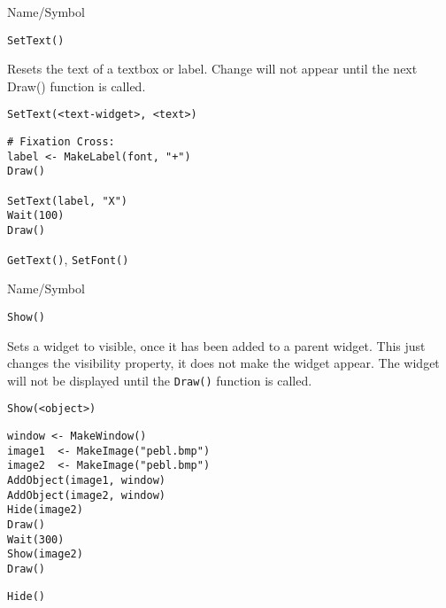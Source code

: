 \rl


\begin{desc}{Name/Symbol}

\item[Name/Symbol] 	\verb+SetText()+

\item[Description] 	Resets the text of a textbox or label.  Change will not
		appear until the next Draw() function is called.

\item[Usage]
\begin{verbatim}
SetText(<text-widget>, <text>)
\end{verbatim}

\item[Example]
\begin{verbatim}
# Fixation Cross:
label <- MakeLabel(font, "+")
Draw()

SetText(label, "X")
Wait(100)
Draw()
\end{verbatim}

\item[See Also]    	\verb+GetText()+, \verb+SetFont()+
\end{desc}

\rl


\begin{desc}{Name/Symbol}
\item[Name/Symbol]  	\verb+Show()+

\item[Description] Sets a widget to visible, once it has been added to
  a parent widget.  This just changes the visibility property, it does
  not make the widget appear.  The widget will not be displayed until
  the \verb+Draw()+ function is called.

\item[Usage]
\begin{verbatim}
Show(<object>)
\end{verbatim}

\item[Example]
\begin{verbatim}
window <- MakeWindow()
image1  <- MakeImage("pebl.bmp")
image2  <- MakeImage("pebl.bmp")
AddObject(image1, window)
AddObject(image2, window)
Hide(image2)
Draw()
Wait(300)
Show(image2)
Draw()
\end{verbatim}

\item[See Also]     	\verb+Hide()+
\end{desc}

\rl




